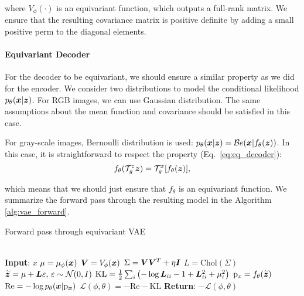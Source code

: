 where $V_{\phi}(\cdot)$ is an equivariant function, which outputs a full-rank matrix.  We ensure that the resulting covariance matrix is positive definite by adding a small positive perm to the diagonal elements.

\paragraph{Equivariant Decoder}
For the decoder to be equivariant, we should ensure a similar property as we did for the encoder. We consider two distributions to model the conditional likelihood $p_{\theta}({\bm{x}}|{\bm{z}})$. For RGB images, we can use Gaussian distribution. The same assumptions about the mean function and covariance should be satisfied in this case. 

For gray-scale images, Bernoulli distribution is used: $p_{\theta}({\bm{x}}|{\bm{z}}) = \mathcal{B}e({\bm{x}} | f_{\theta}({\bm{z}}))$. In this case, it is straightforward to respect the property (Eq.~\ref{eq:eq_decoder}): 
\begin{equation}
f_{\theta}({\mathcal{T}}_g^z {\bm{z}})  = \mathcal{T}_g^x[f_{\theta}({\bm{z}})],
\end{equation}

which means that we should just ensure that $f_{\theta}$ is an equivariant function. We summarize the forward pass through the resulting model in the Algorithm \ref{alg:vae_forward}.

\begin{algorithm}[t]
	\caption{Forward pass through equivariant VAE}
	\label{alg:vae_forward}
	\begin{algorithmic}
        \\\hrulefill
	    \State \hskip-3mm \textbf{Input}: $x$
	    \State $\mu = \mu_{\phi}({\bm{x}})$  
	    \State ${\bm{V}} = V_{\phi}({\bm{x}})$
		\State $\Sigma = {\bm{V}}{\bm{V}}^T + \eta {\bm{I}}$
		\State $L = \text{Chol}(\Sigma)$ 
		\State $\widetilde{{\bm{z}}} = \mu + {\bm{L}} \varepsilon, \, \varepsilon \sim \mathcal{N}(0, I)$
		\State $\text{KL} = \tfrac12\sum_i\left(-\log {\bm{L}}_{ii} - 1 + {\bm{L}}_{ii}^2 + \mu_i^2 \right)$
		\State $\mathrm{p}_x = f_{\theta}(\widetilde{{\bm{z}}})$ 
		\State $\text{Re} = -\log p_{\theta}({\bm{x}}| \mathrm{p}_{\bm{x}})$ 
		\State $\mathcal{L}(\phi, \theta) =  - \text{Re} - \text{KL}$ 
		\State  \hskip-3mm \textbf{Return}: $ - \mathcal{L}(\phi, \theta)$
	\end{algorithmic}
\end{algorithm}

